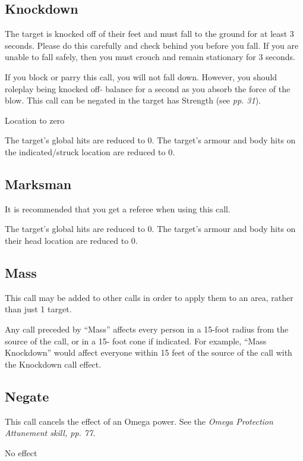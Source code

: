  

\subsection{Knockdown}

The target is knocked off of their feet and must fall to the ground for at least 3 seconds. Please do this carefully and check behind you before you fall. If you are unable to fall safely, then you must crouch and remain stationary for 3 seconds.

If you block or parry this call, you will not fall down. However, you should roleplay being knocked off- balance for a second as you absorb the force of the blow. This call can be negated in the target has Strength (see \textit{pp. 31}).

Location to zero

The target's global hits are reduced to 0. The target's armour and body hits on the indicated/struck location are reduced to 0.

\subsection{Marksman}

It is recommended that you get a referee when using this call.

The target's global hits are reduced to 0. The target's armour and body hits on their head location are reduced to 0.

\subsection{Mass}

This call may be added to other calls in order to apply them to an area, rather than just 1 target.

Any call preceded by ``Mass'' affects every person in a 15-foot radius from the source of the call, or in a 15- foot cone if indicated. For example, ``Mass Knockdown'' would affect everyone within 15 feet of the source of the call with the Knockdown call effect.

\subsection{Negate}

This call cancels the effect of an Omega power. See the \textit{Omega Protection Attunement skill, pp. 77}.

No effect

